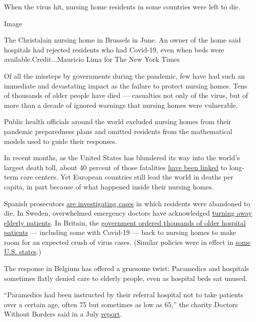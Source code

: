 When the virus hit, nursing home residents in some countries were left
to die.

Image

The Christalain nursing home in Brussels in June. An owner of the home
said hospitals had rejected residents who had Covid-19, even when beds
were available.Credit...Mauricio Lima for The New York Times

Of all the missteps by governments during the pandemic, few have had
such an immediate and devastating impact as the failure to protect
nursing homes. Tens of thousands of older people have died ---
casualties not only of the virus, but of more than a decade of ignored
warnings that nursing homes were vulnerable.

Public health officials around the world excluded nursing homes from
their pandemic preparedness plans and omitted residents from the
mathematical models used to guide their responses.

In recent months, as the United States has blundered its way into the
world's largest death toll, about 40 percent of those fatalities
\href{https://www.kff.org/health-costs/issue-brief/state-data-and-policy-actions-to-address-coronavirus/\#stateleveldata}{have
been linked} to long-term care centers. Yet European countries still
lead the world in deaths per capita, in part because of what happened
inside their nursing homes.

Spanish prosecutors
\href{https://www.nytimes.com/2020/03/25/world/europe/Spain-coronavirus-nursing-homes.html}{are
investigating cases} in which residents were abandoned to die. In
Sweden, overwhelmed emergency doctors have acknowledged
\href{https://www.dn.se/nyheter/sverige/overlakare-logn-att-patienter-inte-prioriterats-bort/}{turning
away elderly patients}. In Britain, the
\href{https://www.independent.co.uk/news/health/coronavirus-care-homes-nhs-hospital-discharges-deaths-a9544671.html}{government
ordered thousands of older hospital patients} --- including some with
Covid-19 --- back to nursing homes to make room for an expected crush of
virus cases. (Similar policies were in effect in
\href{https://www.nytimes.com/2020/04/24/us/nursing-homes-coronavirus.html}{some
U.S. states}.)

The response in Belgium has offered a gruesome twist: Paramedics and
hospitals sometimes flatly denied care to elderly people, even as
hospital beds sat unused.

``Paramedics had been instructed by their referral hospital not to take
patients over a certain age, often 75 but sometimes as low as 65,'' the
charity Doctors Without Borders said in a July
\href{https://www.msf.org/sites/msf.org/files/2020-07/Left\%20behind\%20-\%20MSF\%20care\%20homes\%20in\%20Belgium\%20report.pdf}{report}.

